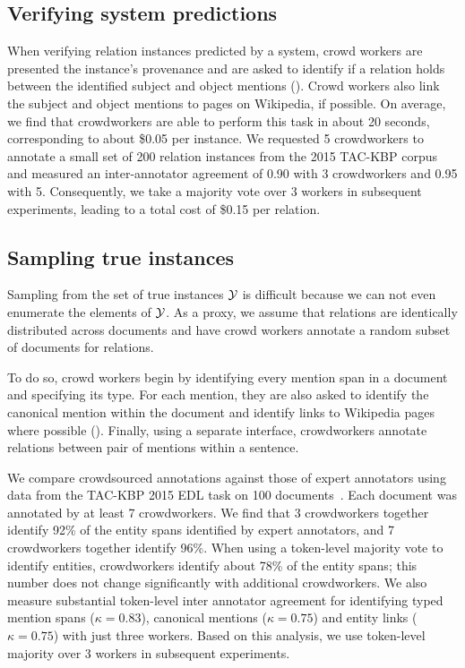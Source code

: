 \subsection{Verifying system predictions}
When verifying relation instances predicted by a system, 
  crowd workers are presented the instance's provenance and are asked to identify if a relation holds between the identified subject and object mentions (). 
  Crowd workers also link the subject and object mentions to pages on Wikipedia, if possible.
On average, we find that crowdworkers are able to perform this task in about 20 seconds, corresponding to about \$0.05 per instance.
We requested 5 crowdworkers to annotate a small set of 200 relation instances from the 2015 TAC-KBP corpus 
and measured an inter-annotator agreement of 0.90 with 3 crowdworkers and 0.95 with 5.
Consequently, we take a majority vote over 3 workers in subsequent experiments, leading to a total cost of \$0.15 per relation.

\subsection{Sampling true instances}
Sampling from the set of true instances $\mathcal{Y}$ is difficult because we can not even enumerate the elements of $\mathcal{Y}$.
As a proxy, we assume that relations are identically distributed across documents and have crowd workers annotate a random subset of documents for relations.

To do so, crowd workers begin by identifying every mention span in a document and specifying its type.
  For each mention, they are also asked to identify the canonical mention within the document
  and identify links to Wikipedia pages where possible ().
Finally, using a separate interface, crowdworkers annotate relations between pair of mentions within a sentence.

We compare crowdsourced annotations against those of expert annotators using data from the TAC-KBP 2015 EDL task on 100 documents~\citep{}.
Each document was annotated by at least 7 crowdworkers.
We find that 3 crowdworkers together identify 92\% of the entity spans identified by expert annotators,
  and 7 crowdworkers together identify 96\%.
When using a token-level majority vote to identify entities, crowdworkers identify about 78\% of the entity spans; this number does not change significantly with additional crowdworkers.
We also measure substantial token-level inter annotator agreement for identifying typed mention spans ($\kappa = 0.83$), canonical mentions ($\kappa = 0.75$) and entity links ($\kappa = 0.75$) with just three workers.
Based on this analysis, we use token-level majority over 3 workers in subsequent experiments.

